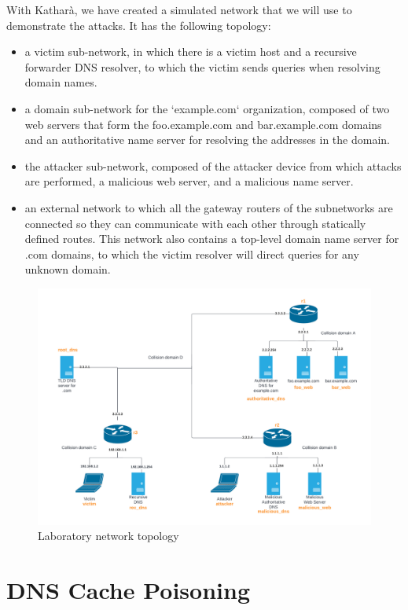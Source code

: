 \documentclass[11pt,a4paper]{article}
\begin{document}
With Katharà, we have created a simulated network that we will use to demonstrate the attacks.
It has the following topology:
\begin{itemize}
\item a victim sub-network, in which there is a victim host and a recursive forwarder DNS
resolver, to which the victim sends queries when resolving domain names.
\item a domain sub-network for the ‘example.com‘ organization, composed of two web
servers that form the foo.example.com and bar.example.com domains and an authoritative
name server for resolving the addresses in the domain.
\item the attacker sub-network, composed of the attacker device from which attacks are
performed, a malicious web server, and a malicious name server.
\item an external network to which all the gateway routers of the subnetworks are connected so
they can communicate with each other through statically defined routes. This network also
contains a top-level domain name server for .com domains, to which the victim resolver
will direct queries for any unknown domain.
\end{itemize}

\begin{figure}[h!]
  \centering
  \includegraphics[width=\textwidth]{network-topology.png}
  \caption{Laboratory network topology}
\end{figure}

\section{DNS Cache Poisoning}
\end{document}
